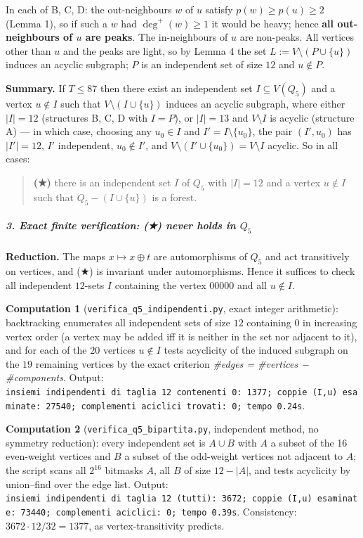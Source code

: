 In each of B, C, D: the out-neighbours \(w\) of \(u\) satisfy
\(p(w)\ge p(u)\ge2\) (Lemma 1), so if such a \(w\) had \(\deg^+(w)\ge1\)
it would be heavy; hence \textbf{all out-neighbours of \(u\) are peaks}.
The in-neighbours of \(u\) are non-peaks. All vertices other than \(u\)
and the peaks are light, so by Lemma 4 the set
\(L:=V\setminus(P\cup\{u\})\) induces an acyclic subgraph; \(P\) is an
independent set of size \(12\) and \(u\notin P\).

\textbf{Summary.} If \(T\le 87\) then there exist an independent set
\(I\subseteq V(Q_5)\) and a vertex \(u\notin I\) such that
\(V\setminus(I\cup\{u\})\) induces an acyclic subgraph, where either
\(|I|=12\) (structures B, C, D with \(I=P\)), or \(|I|=13\) and
\(V\setminus I\) is acyclic (structure A) --- in which case, choosing
any \(u_0\in I\) and \(I'=I\setminus\{u_0\}\), the pair \((I',u_0)\) has
\(|I'|=12\), \(I'\) independent, \(u_0\notin I'\), and
\(V\setminus(I'\cup\{u_0\})=V\setminus I\) acyclic. So in all cases:

\begin{quote}
\textbf{(★)} there is an independent set \(I\) of \(Q_5\) with
\(|I|=12\) and a vertex \(u\notin I\) such that \(Q_5-(I\cup\{u\})\) is
a forest.
\end{quote}

\subparagraph{\texorpdfstring{3. Exact finite verification: (★) never
holds in
\(Q_5\)}{3. Exact finite verification: (★) never holds in Q\_5}}\label{exact-finite-verification-never-holds-in-q_5}

\textbf{Reduction.} The maps \(x\mapsto x\oplus t\) are automorphisms of
\(Q_5\) and act transitively on vertices, and (★) is invariant under
automorphisms. Hence it suffices to check all independent \(12\)-sets
\(I\) containing the vertex \(00000\) and all \(u\notin I\).

\textbf{Computation 1} (\texttt{verifica\_q5\_indipendenti.py}, exact
integer arithmetic): backtracking enumerates all independent sets of
size \(12\) containing \(0\) in increasing vertex order (a vertex may be
added iff it is neither in the set nor adjacent to it), and for each of
the \(20\) vertices \(u\notin I\) tests acyclicity of the induced
subgraph on the \(19\) remaining vertices by the exact criterion
\emph{\#edges = \#vertices − \#components}. Output:
\texttt{insiemi\ indipendenti\ di\ taglia\ 12\ contenenti\ 0:\ 1377;\ coppie\ (I,u)\ esaminate:\ 27540;\ complementi\ aciclici\ trovati:\ 0;\ tempo\ 0.24s}.

\textbf{Computation 2} (\texttt{verifica\_q5\_bipartita.py}, independent
method, no symmetry reduction): every independent set is \(A\cup B\)
with \(A\) a subset of the 16 even-weight vertices and \(B\) a subset of
the odd-weight vertices not adjacent to \(A\); the script scans all
\(2^{16}\) bitmasks \(A\), all \(B\) of size \(12-|A|\), and tests
acyclicity by union--find over the edge list. Output:
\texttt{insiemi\ indipendenti\ di\ taglia\ 12\ (tutti):\ 3672;\ coppie\ (I,u)\ esaminate:\ 73440;\ complementi\ aciclici:\ 0;\ tempo\ 0.39s}.
Consistency: \(3672\cdot 12/32=1377\), as vertex-transitivity predicts.

